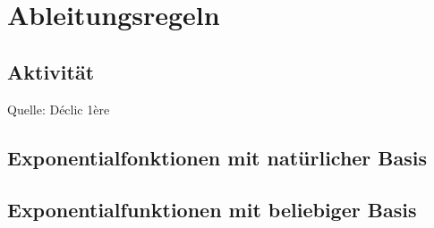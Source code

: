 		


	


		\section{Ableitungsregeln}

	\subsection{Aktivität}

Quelle: Déclic 1ère

	\subsection{Exponentialfonktionen mit natürlicher Basis}

	\subsection{Exponentialfunktionen mit beliebiger Basis}


